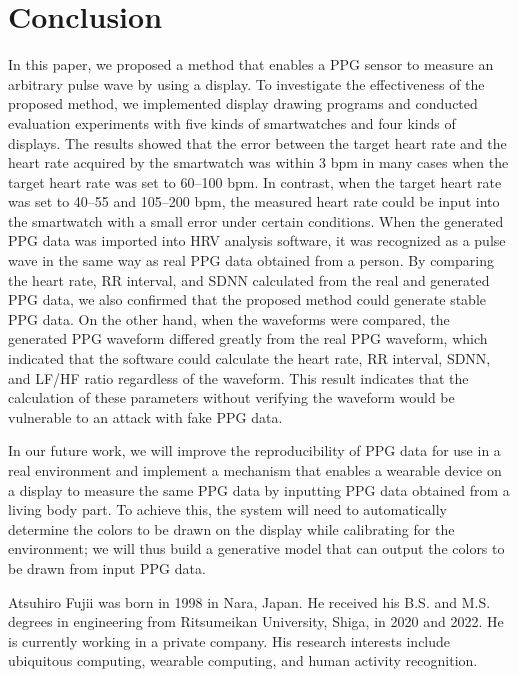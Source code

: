 \documentclass{ieeeaccess}
\begin{document}
\section{Conclusion}
\label{sec:conclusion}
In this paper, we proposed a method that enables a PPG sensor to measure an arbitrary pulse wave by using a display. To investigate the effectiveness of the proposed method, we implemented display drawing programs and conducted evaluation experiments with five kinds of smartwatches and four kinds of displays. The results showed that the error between the target heart rate and the heart rate acquired by the smartwatch was within $3$ bpm in many cases when the target heart rate was set to 60--100 bpm. In contrast, when the target heart rate was set to 40--55 and 105--200 bpm, the measured heart rate could be input into the smartwatch with a small error under certain conditions. When the generated PPG data was imported into HRV analysis software, it was recognized as a pulse wave in the same way as real PPG data obtained from a person. By comparing the heart rate, RR interval, and SDNN calculated from the real and generated PPG data, we also confirmed that the proposed method could generate stable PPG data. On the other hand, when the waveforms were compared, the generated PPG waveform differed greatly from the real PPG waveform, which indicated that the software could calculate the heart rate, RR interval, SDNN, and LF/HF ratio regardless of the waveform. This result indicates that the calculation of these parameters without verifying the waveform would be vulnerable to an attack with fake PPG data.\par

In our future work, we will improve the reproducibility of PPG data for use in a real environment and implement a mechanism that enables a wearable device on a display to measure the same PPG data by inputting PPG data obtained from a living body part. To achieve this, the system will need to automatically determine the colors to be drawn on the display while calibrating for the environment; we will thus build a generative model that can output the colors to be drawn from input PPG data.




 \begin{IEEEbiography}{Atsuhiro Fujii} was born in 1998 in Nara, Japan. He received his B.S. and M.S. degrees in engineering from Ritsumeikan University, Shiga, in 2020 and 2022. He is currently working in a private company. His research interests include ubiquitous computing, wearable computing, and human activity recognition.
 \end{IEEEbiography}
\end{document}
